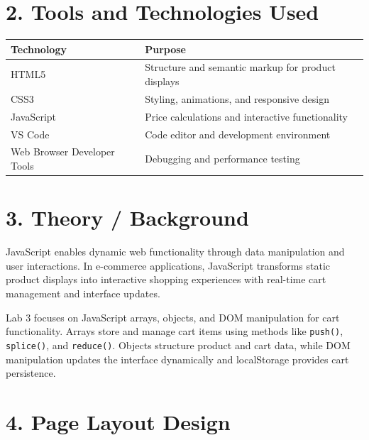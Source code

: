 \documentclass[a4paper,12pt]{article}
\begin{document}
\section*{2. Tools and Technologies Used}
\begin{longtable}{ll}
  \toprule
  \textbf{Technology}         & \textbf{Purpose}                                   \\
  \midrule
  HTML5                       & Structure and semantic markup for product displays \\
  CSS3                        & Styling, animations, and responsive design         \\
  JavaScript                  & Price calculations and interactive functionality   \\
  VS Code                     & Code editor and development environment            \\
  Web Browser Developer Tools & Debugging and performance testing                  \\
  \bottomrule
\end{longtable}

\section*{3. Theory / Background}
JavaScript enables dynamic web functionality through data manipulation and user interactions. In e-commerce applications, JavaScript transforms static product displays into interactive shopping experiences with real-time cart management and interface updates.

Lab 3 focuses on JavaScript arrays, objects, and DOM manipulation for cart functionality. Arrays store and manage cart items using methods like \texttt{push()}, \texttt{splice()}, and \texttt{reduce()}. Objects structure product and cart data, while DOM manipulation updates the interface dynamically and localStorage provides cart persistence.

\section*{4. Page Layout Design}
\end{document}
